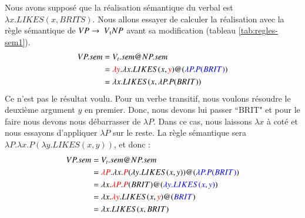 \documentclass{KodeBook}
\begin{document}
Nous avons supposé que la réalisation sémantique du  verbal est $\lambda x.LIKES(x, BRITS)$. 
Nous allons essayer de calculer la réalisation avec la règle sémantique de $VP \rightarrow\ V\textsubscript{t} NP$ avant sa modification (tableau \ref{tab:regles-sem1}).
\begin{align*}
VP.sem & = V_t.sem@NP.sem \\
& = \textcolor{red}{\lambda y}.\lambda x.LIKES(x, \textcolor{red}{y})@(\textcolor{blue}{\lambda P.P(BRIT)})\\
& = \lambda x.LIKES(x, \lambda P.P(BRIT))
\end{align*}
Ce n'est pas le résultat voulu. 
Pour un verbe transitif, nous voulons résoudre le deuxième argument $y$ en premier. 
Donc, nous devons lui passer ``BRIT" et pour le faire nous devons nous débarrasser de $\lambda P$. 
Dans ce cas, nous laissons $\lambda x$ à coté et nous essayons d'appliquer $\lambda P$ sur le reste. 
La règle sémantique sera $\lambda P.\lambda x.P(\lambda y.LIKES(x, y))$, et donc :
\begin{align*}
VP.sem & = V_t.sem@NP.sem \\
& = \textcolor{red}{\lambda P}.\lambda x.\textcolor{red}{P}(\lambda y.LIKES(x, y))@(\textcolor{blue}{\lambda P.P(BRIT)}) \\
& = \lambda x.\textcolor{red}{\lambda P}.\textcolor{red}{P}(BRIT)@(\textcolor{blue}{\lambda y.LIKES(x, y)}) \\
& = \lambda x.\textcolor{red}{\lambda y}.LIKES(x, \textcolor{red}{y})@(\textcolor{blue}{BRIT}) \\
& = \lambda x.LIKES(x, BRIT) \\
\end{align*}
\end{document}
